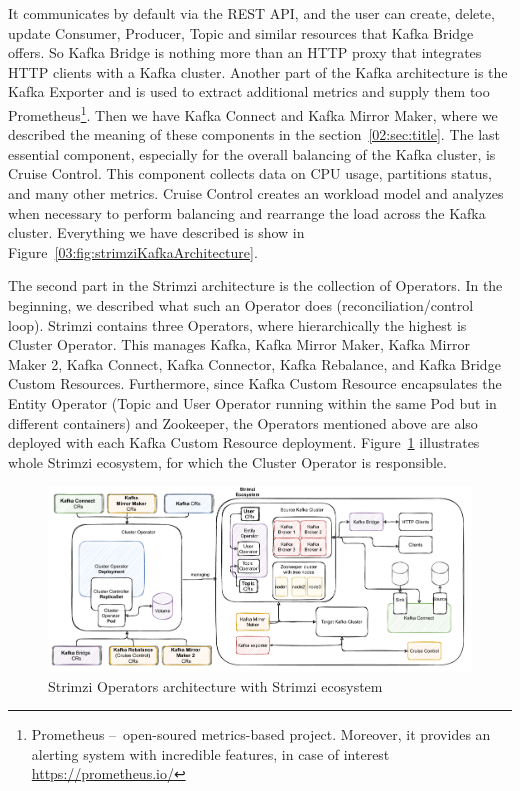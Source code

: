 It communicates by default via the REST API, and the user can create, delete, update Consumer, Producer, Topic and similar resources that Kafka Bridge offers.
 So Kafka Bridge is nothing more than an HTTP proxy that integrates HTTP clients with a Kafka cluster.
 Another part of the Kafka architecture is the Kafka Exporter and is used to extract additional metrics and supply them too Prometheus\footnote{Prometheus \---\ open-soured metrics-based project. Moreover, it provides an alerting system with incredible features, in case of interest \url{https://prometheus.io/}}.
 Then we have Kafka Connect and Kafka Mirror Maker, where we described the meaning of these components in the section~\ref{02:sec:title}.
 The last essential component, especially for the overall balancing of the Kafka cluster, is Cruise Control.
 This component collects data on CPU usage, partitions status, and many other metrics.
 Cruise Control creates an workload model and analyzes when necessary to perform balancing and rearrange the load across the Kafka cluster.
 Everything we have described is show in Figure~\ref{03:fig:strimziKafkaArchitecture}.

The second part in the Strimzi architecture is the collection of Operators.
In the beginning, we described what such an Operator does (reconciliation/control loop).
Strimzi contains three Operators, where hierarchically the highest is Cluster Operator.
This manages Kafka, Kafka Mirror Maker, Kafka Mirror Maker 2, Kafka Connect, Kafka Connector, Kafka Rebalance, and Kafka Bridge Custom Resources.
Furthermore, since Kafka Custom Resource encapsulates the Entity Operator (Topic and User Operator running within the same Pod but in different containers) and Zookeeper, the Operators mentioned above are also deployed with each Kafka Custom Resource deployment.
Figure~\ref{03:fig:strimziOperatorsArchitecture} illustrates whole Strimzi ecosystem, for which the Cluster Operator is responsible.

\begin{figure}[!ht]
    \centering
    \includegraphics[scale=0.55]{obrazky-figures/02-preliminaries/03-strimzi/04-stirmziOperatorsArch}
    \caption{Strimzi Operators architecture with Strimzi ecosystem}
    \label{03:fig:strimziOperatorsArchitecture}
\end{figure}

